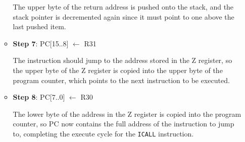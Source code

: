 \documentclass[11pt]{article}
\begin{document}
\begin{enumerate}[leftmargin=0.2in]
\begin{itemize}
    The upper byte of the return address is pushed onto the stack, and the stack pointer is decremented again since it must point to one above the last pushed item.

  \item \textbf{Step 7}: PC[15..8] $\leftarrow$ R31

    The instruction should jump to the address stored in the Z register, so the upper byte of the Z register is copied into the upper byte of the program counter, which points to the next instruction to be executed.

  \item \textbf{Step 8}: PC[7..0] $\leftarrow$ R30

    The lower byte of the address in the Z register is copied into the program counter, so PC now contains the full address of the instruction to jump to, completing the execute cycle for the \texttt{ICALL} instruction.
\end{itemize}


\end{enumerate}
\end{document}
